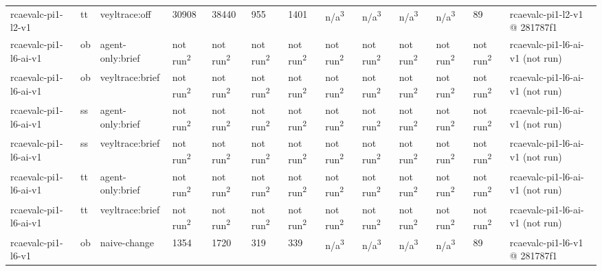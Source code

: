 \begin{table}[t]
\begin{tabular}{lllllllllllll}
rcaevalc-pi1-l2-v1 & tt & veyltrace:off & 30908 & 38440 & 955 & 1401 & n/a\textsuperscript{3} & n/a\textsuperscript{3} & n/a\textsuperscript{3} & n/a\textsuperscript{3} & 89 & rcaevalc-pi1-l2-v1 @ 281787f1 \\
rcaevalc-pi1-l6-ai-v1 & ob & agent-only:brief & not run\textsuperscript{2} & not run\textsuperscript{2} & not run\textsuperscript{2} & not run\textsuperscript{2} & not run\textsuperscript{2} & not run\textsuperscript{2} & not run\textsuperscript{2} & not run\textsuperscript{2} & not run\textsuperscript{2} & rcaevalc-pi1-l6-ai-v1 (not run) \\
rcaevalc-pi1-l6-ai-v1 & ob & veyltrace:brief & not run\textsuperscript{2} & not run\textsuperscript{2} & not run\textsuperscript{2} & not run\textsuperscript{2} & not run\textsuperscript{2} & not run\textsuperscript{2} & not run\textsuperscript{2} & not run\textsuperscript{2} & not run\textsuperscript{2} & rcaevalc-pi1-l6-ai-v1 (not run) \\
rcaevalc-pi1-l6-ai-v1 & ss & agent-only:brief & not run\textsuperscript{2} & not run\textsuperscript{2} & not run\textsuperscript{2} & not run\textsuperscript{2} & not run\textsuperscript{2} & not run\textsuperscript{2} & not run\textsuperscript{2} & not run\textsuperscript{2} & not run\textsuperscript{2} & rcaevalc-pi1-l6-ai-v1 (not run) \\
rcaevalc-pi1-l6-ai-v1 & ss & veyltrace:brief & not run\textsuperscript{2} & not run\textsuperscript{2} & not run\textsuperscript{2} & not run\textsuperscript{2} & not run\textsuperscript{2} & not run\textsuperscript{2} & not run\textsuperscript{2} & not run\textsuperscript{2} & not run\textsuperscript{2} & rcaevalc-pi1-l6-ai-v1 (not run) \\
rcaevalc-pi1-l6-ai-v1 & tt & agent-only:brief & not run\textsuperscript{2} & not run\textsuperscript{2} & not run\textsuperscript{2} & not run\textsuperscript{2} & not run\textsuperscript{2} & not run\textsuperscript{2} & not run\textsuperscript{2} & not run\textsuperscript{2} & not run\textsuperscript{2} & rcaevalc-pi1-l6-ai-v1 (not run) \\
rcaevalc-pi1-l6-ai-v1 & tt & veyltrace:brief & not run\textsuperscript{2} & not run\textsuperscript{2} & not run\textsuperscript{2} & not run\textsuperscript{2} & not run\textsuperscript{2} & not run\textsuperscript{2} & not run\textsuperscript{2} & not run\textsuperscript{2} & not run\textsuperscript{2} & rcaevalc-pi1-l6-ai-v1 (not run) \\
rcaevalc-pi1-l6-v1 & ob & naive-change & 1354 & 1720 & 319 & 339 & n/a\textsuperscript{3} & n/a\textsuperscript{3} & n/a\textsuperscript{3} & n/a\textsuperscript{3} & 89 & rcaevalc-pi1-l6-v1 @ 281787f1 \\

\end{tabular}
\end{table}
